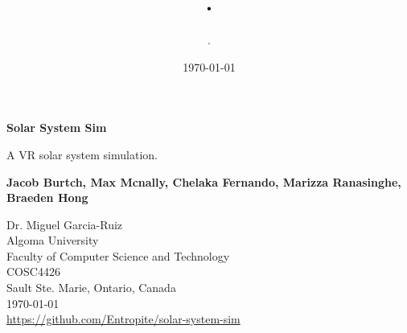 \documentclass{article}
\author{.}
\title{.}
\date{\today}
\begin{document}
    \begin{titlepage}
        \begin{center}
            \vspace*{\fill}

            \Huge
            \textbf{Solar System Sim}

            \vspace{0.5cm}
            \Large
            A VR solar system simulation.

            \vspace{1.5cm}

            \textbf{Jacob Burtch, Max Mcnally, Chelaka Fernando, Marizza Ranasinghe, Braeden Hong}

            \Large
            Dr. Miguel Garcia-Ruiz\\
            Algoma University\\
            Faculty of Computer Science and Technology\\
            COSC4426\\
            Sault Ste. Marie, Ontario, Canada\\
            \today\\
            \href{https://github.com/Entropite/solar-system-sim}{https://github.com/Entropite/solar-system-sim}\\
            \vspace*{\fill}
        \end{center}
    \end{titlepage}
    \newpage
\end{document}
